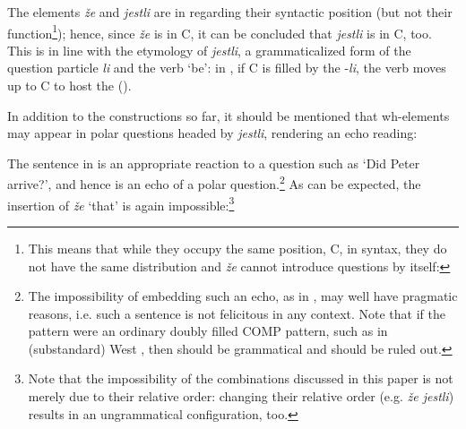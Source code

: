 \documentclass[output=paper,modfonts, hidelinks, newtxmath]{langscibook}
\begin{document}
\noindent The elements \textit{že} and \textit{jestli} are in  regarding their syntactic position (but not their function\footnote{This means that while they occupy the same position, C, in syntax, they do not have the same distribution and \textit{že} cannot introduce questions by itself:

\z 

}); hence, since \textit{že} is in C, it can be concluded that \textit{jestli} is in C, too. This is in line with the etymology of \textit{jestli}, a grammaticalized form of the question particle \textit{li} and the verb `be': in , if C is filled by the  -\textit{li}, the verb moves up to C to host the  (\citealt{schwabe2004}).

In addition to the constructions so far, it should be mentioned that wh-elements may appear in polar questions headed by \textit{jestli}, rendering an echo reading:

\ea
	\z 
\z 

\noindent The sentence in  is an appropriate reaction to a question such as `Did Peter arrive?', and hence is an echo of a polar question.\footnote{The impossibility of embedding such an echo, as in , may well have pragmatic reasons, i.e. such a sentence is not felicitous in any context. Note that if the  pattern were an ordinary doubly filled COMP pattern, such as in (substandard) West , then  should be grammatical and  should be ruled out.} As can be expected, the insertion of \textit{že} `that' is again impossible:\footnote{Note that the impossibility of the combinations discussed in this paper is not merely due to their relative order: changing their relative order (e.g. \textit{že jestli}) results in an ungrammatical configuration, too.}
\end{document}
